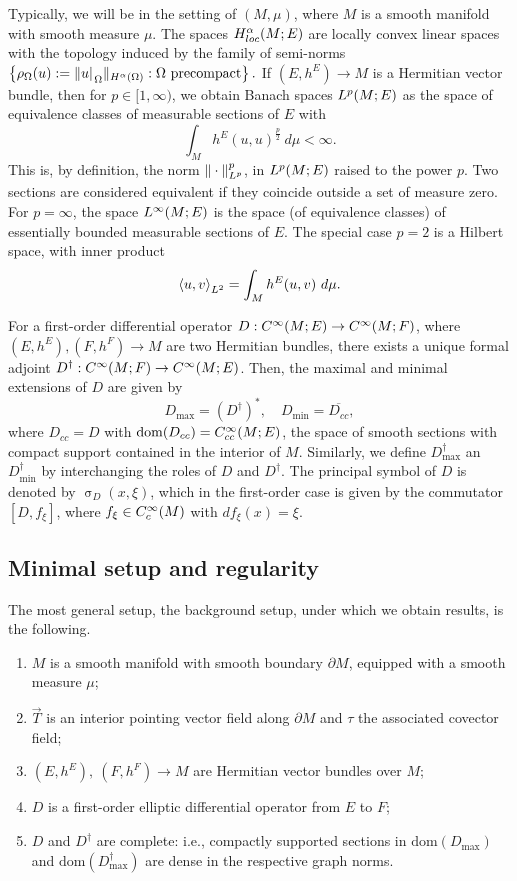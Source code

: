 \documentclass[a4paper,10pt,reqno]{amsart}
\newcommand{\sym}{\upsigma}
\newcommand{\rest}[1]{{{\lvert_{}}_{}}_{#1}}
\newcommand{\dbrac}[1]{\left\{#1\right\}}
\newcommand{\ad}{\ast}
\newcommand{\norm}[1]{\| #1 \|}%
\newcommand{\set}[1]{\dbrac{#1}}
\newcommand{\Lp}[2][{}]{{\rm L}^{#2}_{\rm #1}}%
\newcommand{\Ck}[2][{}]{{\rm C}^{#2}_{\rm #1}}%
\newcommand{\Hard}[2][{}]{{\rm H}^{#2}_{\rm #1}}%
\newcommand{\SobH}[2][{}]{\Hard[#1]{\rm #2}}
\newcommand{\dom}{\mathrm{dom}}
\newcommand{\close}[1]{\overline{#1}}
\newcommand{\inprod}[1]{\left\langle #1 \right\rangle}%
\newcommand{\dM}{\partial M}
\theoremstyle{definition}
\begin{document}
Typically, we will be in the setting of $(M,\mu)$, where $M$ is a smooth manifold with smooth measure $\mu$.
The spaces $\SobH[loc]{\alpha}(M;E)$ are locally convex linear spaces with the topology induced by the family of semi-norms $ \set{ \rho_{\Omega}(u) := \norm{u\rest{\Omega}}_{\SobH{\alpha}(\Omega)}: \Omega \text{ precompact} }.$
If $(E,h^E) \to M$ is a Hermitian vector bundle, then for $p \in [1,\infty)$, we obtain  Banach spaces $\Lp{p}(M;E)$ as the space of equivalence classes of measurable sections of $E$ with
$$ \int_{M} h^E(u,u)^{\frac{p}{2}}\ d\mu < \infty.$$
This is, by definition,  the norm $\norm{\cdot}_{\Lp{p}}^p$,  in $\Lp{p}(M;E)$ raised to the power $p$.
Two sections are considered equivalent if they coincide outside a set of measure zero.
For $p = \infty$, the space $\Lp{\infty}(M;E)$ is the space (of equivalence classes) of essentially bounded measurable sections of $E$.
The special case $p = 2$ is a Hilbert space, with inner product
$$\inprod{u,v}_{\Lp{2}} = \int_{M} h^E(u,v)\ d\mu.$$

For a first-order differential operator $D: \Ck{\infty}(M;E) \to \Ck{\infty}(M;F)$, where $(E,h^E), (F,h^F) \to M$ are two Hermitian bundles, there exists a unique formal adjoint $D^\dagger: \Ck{\infty}(M;F) \to \Ck{\infty}(M;E)$.
Then, the  maximal and minimal extensions  of $D$ are given by
$$ D_{\max} = (D^\dagger)^\ad,\quad D_{\min} = \close{D_{cc}},$$
where $D_{cc} = D$ with $\dom(D_{cc}) = \Ck[cc]{\infty}(M;E)$, the space of smooth sections with compact support contained in the interior of $M$.
Similarly, we define $D^\dagger_{\max}$ an $D^\dagger_{\min}$ by interchanging the roles of $D$ and $D^\dagger$.
The principal symbol of $D$ is denoted by $\sym_D(x,\xi)$, which in the first-order case is given by the commutator $[D, f_\xi]$, where $f_{\xi} \in \Ck[c]{\infty}(M)$ with $d f_{\xi}(x) = \xi$.


\subsection{Minimal setup and regularity}

The most general setup, the background setup,  under which we obtain results, is the following.
\begin{enumerate}[label=(M\arabic*), labelwidth=0pt, labelindent=2pt, leftmargin=26pt]
\label{StdSetup}
\item \label{Hyp:StdFirst}
      $M$ is a smooth manifold with smooth boundary $\dM$, equipped with a smooth measure $\mu$;
\item  \label{Hyp:InteriorVec}
      $\vec{T}$ is an interior pointing vector field along $\dM$ and $\tau$ the associated covector field;
\item $(E,h^E),\ (F,h^F) \to M$ are Hermitian vector bundles over $M$;
\item $D$ is a first-order elliptic differential operator from $E$ to $F$;
\item \label{Hyp:StdLast}
      \label{Hyp:Complete}
      $D$ and $D^\dagger$ are complete: i.e., compactly supported sections in $\dom(D_{\max})$ and $\dom(D^\dagger_{\max})$  are dense in the respective graph norms.
\end{enumerate}
\end{document}
